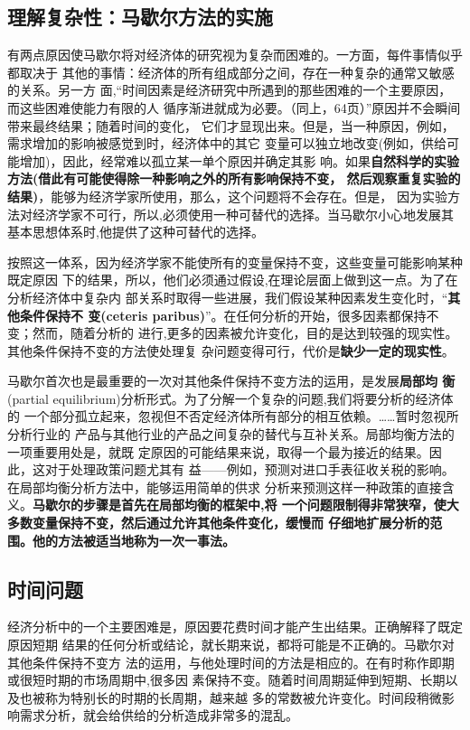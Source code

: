\subsection{理解复杂性：马歇尔方法的实施}

有两点原因使马歇尔将对经济体的研究视为复杂而困难的。一方面，每件事情似乎都取决于
其他的事情：经济体的所有组成部分之间，存在一种复杂的通常又敏感的关系。另一方
面,“时间因素是经济研究中所遇到的那些困难的一个主要原因，而这些困难使能力有限的人
循序渐进就成为必要。（同上，64页）”原因并不会瞬间带来最终结果；随着时间的变化，
它们才显现出来。但是，当一种原因，例如，需求增加的影响被感觉到时，经济体中的其它
变量可以独立地改变(例如，供给可能增加)，因此，经常难以孤立某一单个原因并确定其影
响。如果\textbf{自然科学的实验方法(借此有可能使得除一种影响之外的所有影响保持不变，
  然后观察重复实验的结果)}，能够为经济学家所使用，那么，这个问题将不会存在。但是，
因为实验方法对经济学家不可行，所以,必须使用一种可替代的选择。当马歇尔小心地发展其
基本思想体系时,他提供了这种可替代的选择。

按照这一体系，因为经济学家不能使所有的变量保持不变，这些变量可能影响某种既定原因
下的结果，所以，他们必须通过假设,在理论层面上做到这一点。为了在分析经济体中复杂内
部关系时取得一些进展，我们假设某种因素发生变化时，“\textbf{其他条件保持不
  变(ceteris paribus)}”。在任何分析的开始，很多因素都保持不变；然而，随着分析的
进行,更多的因素被允许变化，目的是达到较强的现实性。其他条件保持不变的方法使处理复
杂问题变得可行，代价是\textbf{缺少一定的现实性}。

马歇尔首次也是最重要的一次对其他条件保持不变方法的运用，是发展\textbf{局部均
  衡}(partial equilibrium)分析形式。为了分解一个复杂的问题,我们将要分析的经济体的
一个部分孤立起来，忽视但不否定经济体所有部分的相互依赖。……暂时忽视所分析行业的
产品与其他行业的产品之间复杂的替代与互补关系。局部均衡方法的一项重要用处是，就既
定原因的可能结果来说，取得一个最为接近的结果。因此，这对于处理政策问题尤其有
益——例如，预测对进口手表征收关税的影响。在局部均衡分析方法中，能够运用简单的供求
分析来预测这样一种政策的直接含义。\textbf{马歇尔的步骤是首先在局部均衡的框架中,将
  一个问题限制得非常狭窄，使大多数变量保持不变，然后通过允许其他条件变化，缓慢而
  仔细地扩展分析的范围。他的方法被适当地称为一次一事法。}

\subsection{时间问题}

经济分析中的一个主要困难是，原因要花费时间才能产生出结果。正确解释了既定原因短期
结果的任何分析或结论，就长期来说，都将可能是不正确的。马歇尔对其他条件保持不变方
法的运用，与他处理时间的方法是相应的。在有时称作即期或很短时期的市场周期中,很多因
素保持不变。随着时间周期延伸到短期、长期以及也被称为特别长的时期的长周期，越来越
多的常数被允许变化。时间段稍微影响需求分析，就会给供给的分析造成非常多的混乱。

